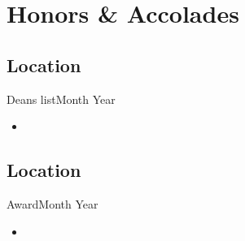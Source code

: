 \section{Honors \& Accolades}
\subsection{Location}{Deans list}{Month Year}
\begin{itemize}
    \item \lipsum[3][2-4]
\end{itemize}
\subsection{Location}{Award}{Month Year}
\begin{itemize}
    \item \lipsum[5][2-4]
\end{itemize}
